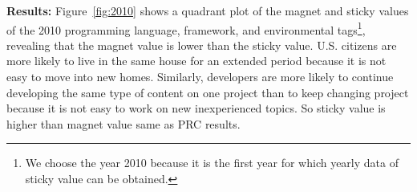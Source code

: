 \documentclass[conference]{IEEEtran}
\begin{document}





\noindent \textbf{Results:}
Figure~\ref{fig:2010} shows a quadrant plot of the magnet and sticky values ​​of the 2010 programming language, framework, and environmental tags\footnote{We choose the year 2010 because it is the first year for which yearly data of sticky value can be obtained.}, revealing that the magnet value is lower than the sticky value. U.S. citizens are more likely to live in the same house for an extended period because it is not easy to move into new homes. Similarly, developers are more likely to continue developing the same type of content on one project than to keep changing project because it is not easy to work on new inexperienced topics. So sticky value is higher than magnet value same as PRC results.
 
\end{document}
